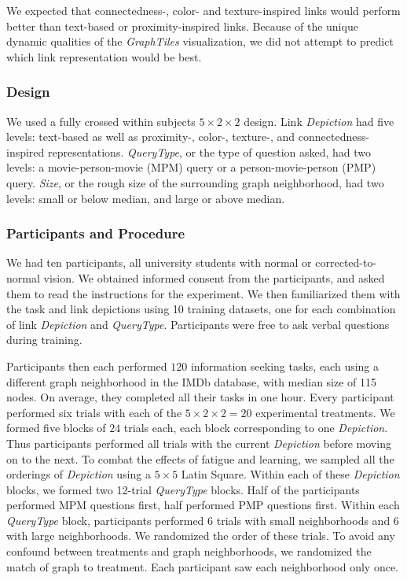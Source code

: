 \documentclass{sigchi}
\begin{document}
We expected that connectedness-, color- and texture-inspired links would perform better than text-based or proximity-inspired links. Because of the unique dynamic qualities of the \textit{GraphTiles} visualization, we did not attempt to predict which link representation would be best.

\subsubsection{Design}

We used a fully crossed within subjects $5 \times 2 \times 2$ design. Link \textit{Depiction} had five levels: text-based as well as proximity-, color-, texture-, and connectedness-inspired representations. \textit{QueryType}, or the type of question asked, had two levels: a movie-person-movie (MPM) query or a person-movie-person (PMP) query. \textit{Size}, or the rough size of the surrounding graph neighborhood, had two levels: small or below median, and large or above median.


\subsubsection{Participants and Procedure}

We had ten participants, all university students with normal or corrected-to-normal vision. We obtained informed consent from the participants, and asked them to read the instructions for the experiment. We then familiarized them with the task and link depictions using 10 training datasets, one for each combination of link \textit{Depiction} and \textit{QueryType}. Participants were free to ask verbal questions during training.

Participants then each performed $120$ information seeking tasks, each using a different graph neighborhood in the IMDb database, with median size of 115 nodes. On average, they completed all their tasks in one hour. Every participant performed six trials with each of the $5 \times 2 \times 2 = 20$ experimental treatments. We formed five blocks of $24$ trials each, each block corresponding to one \textit{Depiction}. Thus participants performed all trials with the current \textit{Depiction} before moving on to the next. To combat the effects of fatigue and learning, we sampled all the orderings of \textit{Depiction} using a $5 \times 5$ Latin Square. Within each of these \textit{Depiction} blocks, we formed two 12-trial \textit{QueryType} blocks. Half of the participants performed MPM questions first, half performed PMP questions first. Within each \textit{QueryType} block, participants performed 6 trials with small neighborhoods and 6 with large neighborhoods. We randomized the order of these trials. To avoid any confound between treatments and graph neighborhoods, we randomized the match of graph to treatment. Each participant saw each neighborhood only once.
\end{document}
